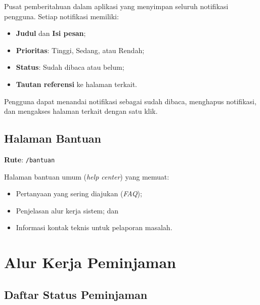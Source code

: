\documentclass[
  12pt,
  a4paper,
  oneside,
  final
]{report}
\begin{document}
Pusat pemberitahuan dalam aplikasi yang menyimpan seluruh notifikasi
pengguna. Setiap notifikasi memiliki:
\begin{itemize}
  \item {\bfseries Judul} dan {\bfseries Isi pesan};
  \item {\bfseries Prioritas}: Tinggi, Sedang, atau Rendah;
  \item {\bfseries Status}: Sudah dibaca atau belum;
  \item {\bfseries Tautan referensi} ke halaman terkait.
\end{itemize}

Pengguna dapat menandai notifikasi sebagai sudah dibaca,
menghapus notifikasi, dan mengakses halaman terkait dengan
satu klik.

\section{Halaman Bantuan}
\textbf{Rute}: \texttt{/bantuan}

Halaman bantuan umum ({\it help center}) yang memuat:
\begin{itemize}
  \item Pertanyaan yang sering diajukan ({\it FAQ});
  \item Penjelasan alur kerja sistem; dan
  \item Informasi kontak teknis untuk pelaporan masalah.
\end{itemize}

\chapter{Alur Kerja Peminjaman}


\section{Daftar Status Peminjaman}
\end{document}
